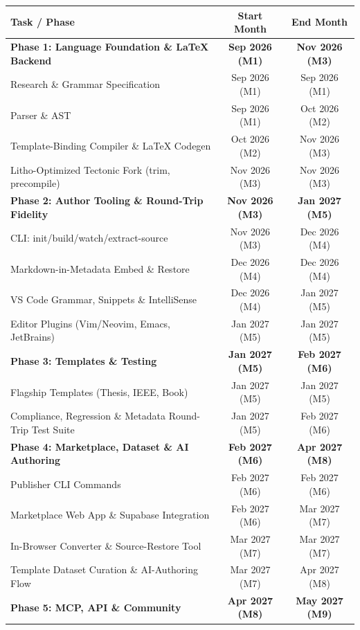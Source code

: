 \documentclass[a4paper,twoside]{article}
\begin{document}
\begin{table}[H]
  \centering
  \begin{tabularx}{\textwidth}{L c c}
    \toprule
    \textbf{Task / Phase} & \textbf{Start Month} & \textbf{End Month} \\
    \midrule
    \textbf{Phase 1: Language Foundation \& LaTeX Backend} & \textbf{Sep 2026 (M1)} & \textbf{Nov 2026 (M3)} \\
    Research \& Grammar Specification & Sep 2026 (M1) & Sep 2026 (M1) \\
    Parser \& AST & Sep 2026 (M1) & Oct 2026 (M2) \\
    Template-Binding Compiler \& LaTeX Codegen & Oct 2026 (M2) & Nov 2026 (M3) \\
    Litho-Optimized Tectonic Fork (trim, precompile) & Nov 2026 (M3) & Nov 2026 (M3) \\
    \midrule
    \textbf{Phase 2: Author Tooling \& Round-Trip Fidelity} & \textbf{Nov 2026 (M3)} & \textbf{Jan 2027 (M5)} \\
    CLI: init/build/watch/extract-source & Nov 2026 (M3) & Dec 2026 (M4) \\
    Markdown-in-Metadata Embed \& Restore & Dec 2026 (M4) & Dec 2026 (M4) \\
    VS Code Grammar, Snippets \& IntelliSense & Dec 2026 (M4) & Jan 2027 (M5) \\
    Editor Plugins (Vim/Neovim, Emacs, JetBrains) & Jan 2027 (M5) & Jan 2027 (M5) \\
    \midrule
    \textbf{Phase 3: Templates \& Testing} & \textbf{Jan 2027 (M5)} & \textbf{Feb 2027 (M6)} \\
    Flagship Templates (Thesis, IEEE, Book) & Jan 2027 (M5) & Jan 2027 (M5) \\
    Compliance, Regression \& Metadata Round-Trip Test Suite & Jan 2027 (M5) & Feb 2027 (M6) \\
    \midrule
    \textbf{Phase 4: Marketplace, Dataset \& AI Authoring} & \textbf{Feb 2027 (M6)} & \textbf{Apr 2027 (M8)} \\
    Publisher CLI Commands & Feb 2027 (M6) & Feb 2027 (M6) \\
    Marketplace Web App \& Supabase Integration & Feb 2027 (M6) & Mar 2027 (M7) \\
    In-Browser Converter \& Source-Restore Tool & Mar 2027 (M7) & Mar 2027 (M7) \\
    Template Dataset Curation \& AI-Authoring Flow & Mar 2027 (M7) & Apr 2027 (M8) \\
    \midrule
    \textbf{Phase 5: MCP, API \& Community} & \textbf{Apr 2027 (M8)} & \textbf{May 2027 (M9)} \\

\end{tabularx}
\end{table}
\end{document}
